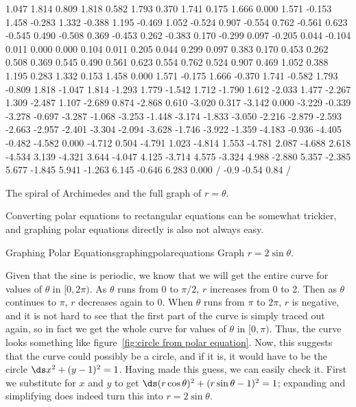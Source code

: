 {{1.047 1.814 0.809 1.818 0.582 1.793 0.370 1.741 0.175 1.666
0.000 1.571 -0.153 1.458 -0.283 1.332 -0.388 1.195 -0.469 1.052
-0.524 0.907 -0.554 0.762 -0.561 0.623 -0.545 0.490 -0.508 0.369
-0.453 0.262 -0.383 0.170 -0.299 0.097 -0.205 0.044 -0.104 0.011
0.000 0.000 0.104 0.011 0.205 0.044 0.299 0.097 0.383 0.170
0.453 0.262 0.508 0.369 0.545 0.490 0.561 0.623 0.554 0.762
0.524 0.907 0.469 1.052 0.388 1.195 0.283 1.332 0.153 1.458
0.000 1.571 -0.175 1.666 -0.370 1.741 -0.582 1.793 -0.809 1.818
-1.047 1.814 -1.293 1.779 -1.542 1.712 -1.790 1.612 -2.033 1.477
-2.267 1.309 -2.487 1.107 -2.689 0.874 -2.868 0.610 -3.020 0.317
-3.142 0.000 -3.229 -0.339 -3.278 -0.697 -3.287 -1.068 -3.253 -1.448
-3.174 -1.833 -3.050 -2.216 -2.879 -2.593 -2.663 -2.957 -2.401 -3.304
-2.094 -3.628 -1.746 -3.922 -1.359 -4.183 -0.936 -4.405 -0.482 -4.582
0.000 -4.712 0.504 -4.791 1.023 -4.814 1.553 -4.781 2.087 -4.688
2.618 -4.534 3.139 -4.321 3.644 -4.047 4.125 -3.714 4.575 -3.324
4.988 -2.880 5.357 -2.385 5.677 -1.845 5.941 -1.263 6.145 -0.646
6.283 0.000 /
\setdashes <2pt>
\setlinear
{} -0.9 -0.54 0.84 /
\endpicture}}
\caption{The spiral of Archimedes and the full graph of $r=\theta$.\label{fig:spiral of Archimedes}}
\endfigure

Converting polar equations to rectangular equations can be somewhat
trickier, and graphing polar equations directly is also not always easy.

\begin{example}{Graphing Polar Equations}{graphingpolarequations}
 Graph $r=2\sin\theta$. 
\end{example}

\begin{solution}
Given that the sine is periodic, we know
that we will get the entire curve for values of $\theta$ in
$[0,2\pi)$. As $\theta$ runs from 0 to $\pi/2$, $r$ increases from 0
to 2. Then as $\theta$ continues to $\pi$, $r$ decreases again to
0. When $\theta$ runs from $\pi$ to $2\pi$, $r$ is negative, and it
is not hard to see that the first part of the curve is simply traced
out again, so in fact we get the whole curve for values of $\theta$
in $[0,\pi)$. Thus, the curve looks something like
figure~\ref{fig:circle from polar equation}. Now, this suggests
that the curve could possibly be a circle, and if it is, it would
have to be the circle $\ds x^2+(y-1)^2=1$. Having made this guess, we
can easily check it. First we substitute for $x$ and $y$ to get
$\ds (r\cos\theta)^2+(r\sin\theta-1)^2=1$; expanding and simplifying
does indeed turn this into $r=2\sin\theta$.
\end{solution}

